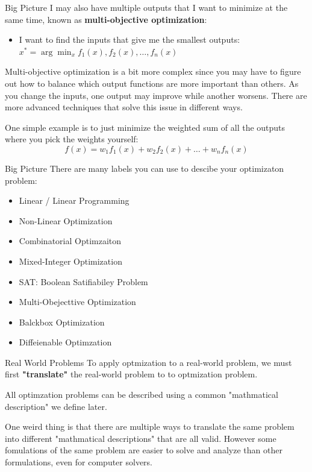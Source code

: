 \documentclass[aspectratio=169]{beamer}
\begin{document}
\begin{frame}{Big Picture}
    I may also have multiple outputs that I want to minimize at the same time, known as \textbf{multi-objective optimization}:
    \begin{itemize}
        \item I want to find the inputs that give me the smallest outputs: $x^* = \arg\min_x f_1(x), f_2(x), \dots, f_n(x)$
    \end{itemize}

    \vspace{\baselineskip}

    Multi-objective optimization is a bit more complex since you may have to figure out how to balance which output functions are more important than others. As you change the inputs, one output may improve while another worsens. There are more advanced techniques that solve this issue in different ways.

    \vspace{\baselineskip}

    One simple example is to just minimize the weighted sum of all the outputs where you pick the weights yourself:
    \begin{equation}
        f(x) = w_1 f_1(x) + w_2 f_2(x) + \dots + w_n f_n(x)
    \end{equation}
\end{frame}

\begin{frame}{Big Picture}
    There are many labels you can use to descibe your optimizaton problem:
    \begin{itemize}
        \item Linear / Linear Programming
        \item Non-Linear Optimization
        \item Combinatorial Optimzaiton
        \item Mixed-Integer Optimization
        \item SAT: Boolean Satifiabiley Problem
        \item Multi-Obejecttive Optimization
        \item Balckbox Optimization
        \item Diffeienable Optimzation
    \end{itemize}
\end{frame}

\begin{frame}{Real World Problems}
    To apply optmization to a real-world problem, we must first \textbf{"translate"} the real-world problem to to optmization problem.
    \vspace{\baselineskip}

    All optimzation problems can be described using a common "mathmatical description" we define later.
    \vspace{\baselineskip}

    One weird thing is that there are multiple ways to translate the same problem into different "mathmatical descriptions" that are all valid. However some fomulations of the same problem are easier to solve and analyze than other formulations, even for computer solvers.
\end{frame}
\end{document}
